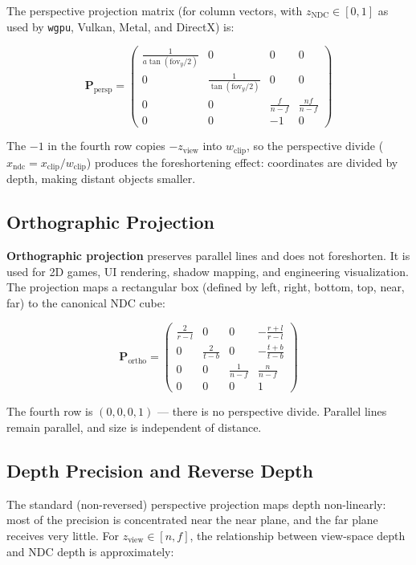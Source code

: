 \documentclass[
  11pt,
  letterpaper,
  DIV=11,
  numbers=noendperiod,
  twoside,
  open=right]{scrreprt}
\begin{document}
The perspective projection matrix (for column vectors, with
\(z_{\text{NDC}} \in [0, 1]\) as used by \texttt{wgpu}, Vulkan, Metal,
and DirectX) is:

\[
\mathbf{P}_{\text{persp}} = \begin{pmatrix}
  \frac{1}{a \tan(\text{fov}_y / 2)} & 0 & 0 & 0 \\
  0 & \frac{1}{\tan(\text{fov}_y / 2)} & 0 & 0 \\
  0 & 0 & \frac{f}{n - f} & \frac{n f}{n - f} \\
  0 & 0 & -1 & 0
\end{pmatrix}
\]

The \(-1\) in the fourth row copies \(-z_{\text{view}}\) into
\(w_{\text{clip}}\), so the perspective divide
(\(x_{\text{ndc}} = x_{\text{clip}} / w_{\text{clip}}\)) produces the
foreshortening effect: coordinates are divided by depth, making distant
objects smaller.

\subsection{Orthographic Projection}\label{orthographic-projection}

\textbf{Orthographic projection} preserves parallel lines and does not
foreshorten. It is used for 2D games, UI rendering, shadow mapping, and
engineering visualization. The projection maps a rectangular box
(defined by left, right, bottom, top, near, far) to the canonical NDC
cube:

\[
\mathbf{P}_{\text{ortho}} = \begin{pmatrix}
  \frac{2}{r - l} & 0 & 0 & -\frac{r + l}{r - l} \\
  0 & \frac{2}{t - b} & 0 & -\frac{t + b}{t - b} \\
  0 & 0 & \frac{1}{n - f} & \frac{n}{n - f} \\
  0 & 0 & 0 & 1
\end{pmatrix}
\]

The fourth row is \((0, 0, 0, 1)\) --- there is no perspective divide.
Parallel lines remain parallel, and size is independent of distance.

\subsection{Depth Precision and Reverse
Depth}\label{depth-precision-and-reverse-depth}

The standard (non-reversed) perspective projection maps depth
non-linearly: most of the precision is concentrated near the near plane,
and the far plane receives very little. For
\(z_{\text{view}} \in [n, f]\), the relationship between view-space
depth and NDC depth is approximately:
\end{document}
